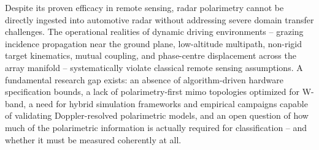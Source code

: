 Despite its proven efficacy in remote sensing, radar polarimetry cannot be directly ingested into automotive radar without addressing severe domain transfer challenges.
The operational realities of dynamic driving environments -- grazing incidence propagation near the ground plane, low-altitude multipath, non-rigid target kinematics, mutual coupling, and phase-centre displacement across the array manifold -- systematically violate classical remote sensing assumptions.
A fundamental research gap exists: an absence of algorithm-driven hardware specification bounds, a lack of polarimetry-first \gls{mimo} topologies optimized for W-band, a need for hybrid simulation frameworks and empirical campaigns capable of validating Doppler-resolved polarimetric models, and an open question of how much of the polarimetric information is actually required for classification -- and whether it must be measured coherently at all.

